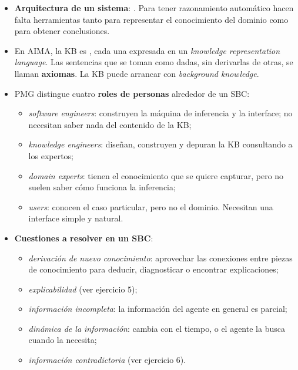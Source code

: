 \documentclass[11pt,a4paper]{article}
\begin{document}
\begin{extras}
\begin{itemize}
  \item \textbf{Arquitectura de un sistema}: . Para tener razonamiento automático hacen falta herramientas tanto para representar el conocimiento del dominio como para obtener conclusiones.
  \item En AIMA, la KB es , cada una expresada en un \textit{knowledge representation language}. Las sentencias que se toman como dadas, sin derivarlas de otras, se llaman \textbf{axiomas}. La KB puede arrancar con \textit{background knowledge}.
  \item PMG distingue cuatro \textbf{roles de personas} alrededor de un SBC:
  \begin{itemize}
    \item \textit{software engineers}: construyen la máquina de inferencia y la interface; no necesitan saber nada del contenido de la KB;
    \item \textit{knowledge engineers}: diseñan, construyen y depuran la KB consultando a los expertos;
    \item \textit{domain experts}: tienen el conocimiento que se quiere capturar, pero no suelen saber cómo funciona la inferencia;
    \item \textit{users}: conocen el caso particular, pero no el dominio. Necesitan una interface simple y natural.
  \end{itemize}
  \item \textbf{Cuestiones a resolver en un SBC}:
  \begin{itemize}
    \item \textit{derivación de nuevo conocimiento}: aprovechar las conexiones entre piezas de conocimiento para deducir, diagnosticar o encontrar explicaciones;
    \item \textit{explicabilidad} (ver ejercicio 5);
    \item \textit{información incompleta}: la información del agente en general es parcial;
    \item \textit{dinámica de la información}: cambia con el tiempo, o el agente la busca cuando la necesita;
    \item \textit{información contradictoria} (ver ejercicio 6).
  \end{itemize}
\end{itemize}
\end{extras}
\end{document}
